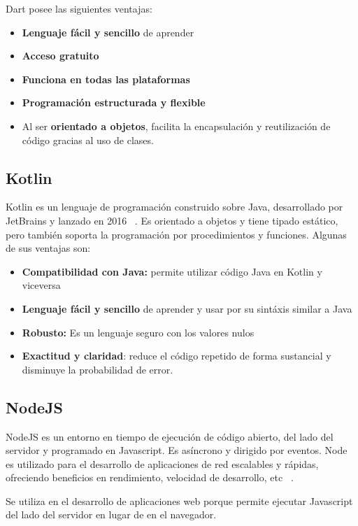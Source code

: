 Dart posee las siguientes ventajas:

\begin{itemize}
\item \textbf{Lenguaje fácil y sencillo} de aprender
\item \textbf{Acceso gratuito}
\item \textbf{Funciona en todas las plataformas}
\item \textbf{Programación estructurada y flexible}
\item Al ser \textbf{orientado a objetos}, facilita la encapsulación y reutilización de código gracias al uso de clases.
 
\end{itemize}

\subsection{Kotlin}
Kotlin es un lenguaje de programación construido sobre Java, desarrollado por JetBrains y lanzado en 2016 ~\cite{kotlin}.
Es orientado a objetos y tiene tipado estático, pero también soporta la programación por procedimientos y funciones. 
\newpage
Algunas de sus ventajas son:
\begin{itemize}
\item \textbf{Compatibilidad con Java:} permite utilizar código Java en Kotlin y viceversa
\item \textbf{Lenguaje fácil y sencillo} de aprender y usar por su sintáxis similar a Java
\item \textbf{Robusto:} Es un lenguaje seguro con los valores nulos 
\item \textbf{Exactitud y claridad}: reduce el código repetido de forma sustancial y disminuye la probabilidad de error.

\end{itemize}


\subsection{NodeJS}
NodeJS es un entorno en tiempo de ejecución de código abierto, del lado del servidor y programado en Javascript. 
Es asíncrono y dirigido por eventos. Node es utilizado para el desarrollo de aplicaciones de red escalables y rápidas, ofreciendo beneficios
en rendimiento, velocidad de desarrollo, etc ~\cite{nodejs}. 

Se utiliza en el desarrollo de aplicaciones web porque permite ejecutar Javascript del lado del servidor en lugar de en el navegador. 


